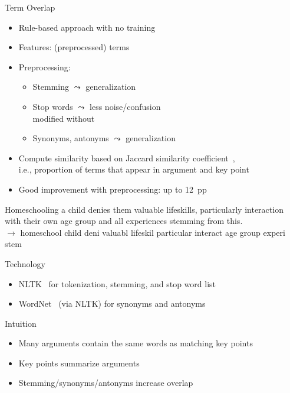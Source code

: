 \documentclass[english,handout]{mlutalk}
\begin{document}
\begin{frame}[allowframebreaks]{Term Overlap}
  
  \begin{itemize}
    \item Rule-based approach with no training
    \item Features: (preprocessed) terms
    \item Preprocessing:
    \begin{itemize}
      \item Stemming \(\leadsto\) generalization
      \item Stop words \(\leadsto\) less noise/confusion \\ modified without 
      \item Synonyms, antonyms \(\leadsto\) generalization
    \end{itemize}
    \item Compute similarity based on Jaccard similarity coefficient~\cite{Jaccard1902}, \\ i.e., proportion of terms that appear in argument and key point
    \item Good improvement with preprocessing: up to 12~pp 
  \end{itemize}
  
  \begin{example}[Preprocessing]
    \smaller
    Homeschooling a child denies them valuable lifeskills, particularly interaction with their own age group and all experiences stemming from this. \\
    \(\to\) homeschool child deni valuabl lifeskil particular interact age group experi stem
  \end{example}

  \framebreak
  
  \begin{block}{Technology}
      \begin{itemize}
        \item NLTK~\cite{Bird2006} for tokenization, stemming,  and stop word list
        \item WordNet~\cite{Miller1995} (via NLTK) for synonyms and antonyms
      \end{itemize}
  \end{block}

  \begin{block}{Intuition}
    \begin{itemize}
      \item Many arguments contain the same words as matching key points
      \item Key points summarize arguments
      \item Stemming/synonyms/antonyms increase overlap
    \end{itemize}


\end{block}
\end{frame}
\end{document}
